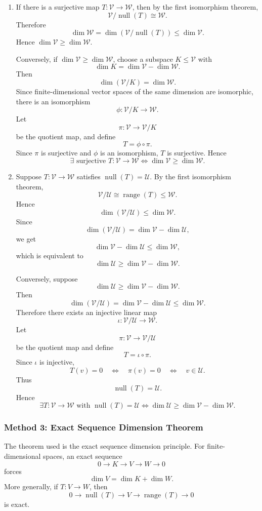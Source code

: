 \documentclass[12pt]{article}
\newcommand{\V}{\mathcal{V}}
\newcommand{\W}{\mathcal{W}}
\newcommand{\U}{\mathcal{U}}
\newcommand{\Null}{\operatorname{null}}
\newcommand{\Range}{\operatorname{range}}
\begin{document}
\begin{enumerate}[label=(\alph*)]
  \item If there is a surjective map $T:\V\to\W$, then by the first isomorphism theorem,
  \[
  \V/\Null(T)\cong \W.
  \]
  Therefore
  \[
  \dim\W=\dim(\V/\Null(T))\le\dim\V.
  \]
  Hence $\dim\V\ge\dim\W$.

  Conversely, if $\dim\V\ge\dim\W$, choose a subspace $K\le\V$ with
  \[
  \dim K=\dim\V-
  \dim\W.
  \]
  Then
  \[
  \dim(\V/K)=\dim\W.
  \]
  Since finite-dimensional vector spaces of the same dimension are isomorphic, there is an isomorphism
  \[
  \phi:\V/K\to\W.
  \]
  Let
  \[
  \pi:\V\to\V/K
  \]
  be the quotient map, and define
  \[
  T=\phi\circ\pi.
  \]
  Since $\pi$ is surjective and $\phi$ is an isomorphism, $T$ is surjective. Hence
  \[
  \boxed{\exists\text{ surjective }T:\V\to\W\iff \dim\V\ge\dim\W.}
  \]

  \item Suppose $T:\V\to\W$ satisfies $\Null(T)=\U$. By the first isomorphism theorem,
  \[
  \V/\U\cong\Range(T)\le\W.
  \]
  Hence
  \[
  \dim(\V/\U)\le\dim\W.
  \]
  Since
  \[
  \dim(\V/\U)=\dim\V-
  \dim\U,
  \]
  we get
  \[
  \dim\V-
  \dim\U\le\dim\W,
  \]
  which is equivalent to
  \[
  \dim\U\ge\dim\V-
  \dim\W.
  \]

  Conversely, suppose
  \[
  \dim\U\ge\dim\V-
  \dim\W.
  \]
  Then
  \[
  \dim(\V/\U)=\dim\V-
  \dim\U\le\dim\W.
  \]
  Therefore there exists an injective linear map
  \[
  \iota:\V/\U\to\W.
  \]
  Let
  \[
  \pi:\V\to\V/\U
  \]
  be the quotient map and define
  \[
  T=\iota\circ\pi.
  \]
  Since $\iota$ is injective,
  \[
  T(v)=0
  \quad\Longleftrightarrow\quad
  \pi(v)=0
  \quad\Longleftrightarrow\quad
  v\in\U.
  \]
  Thus
  \[
  \Null(T)=\U.
  \]
  Hence
  \[
  \boxed{\exists T:\V\to\W\text{ with }\Null(T)=\U
  \iff
  \dim\U\ge\dim\V-
  \dim\W.}
  \]
\end{enumerate}

\newpage
\subsubsection{Method 3: Exact Sequence Dimension Theorem}
The theorem used is the exact sequence dimension principle. For finite-dimensional spaces, an exact sequence
\[
0\to K\to V\to W\to 0
\]
forces
\[
\dim V=\dim K+
\dim W.
\]
More generally, if $T:V\to W$, then
\[
0\to\Null(T)\to V\to\Range(T)\to0
\]
is exact.
\end{document}
